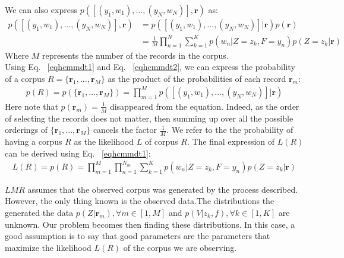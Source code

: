 We can also express $p([(y_{1},w_{1}),...,(y_{N},w_{N})] , \mathbf{r})$ as:
\begin{equation} \label{eqhcmmdt2}
\begin{aligned}
p([(y_{1},w_{1}),...,(y_{N},w_{N})] , \mathbf{r})&=p([(y_{1},w_{1}),...,(y_{N},w_{N})]|\mathbf{r})p(\mathbf{r})\\
&=\frac{1}{M}\prod_{n=1}^{N}\sum_{k=1}^{K}p(w_{n}|Z=z_{k}, F=y_{n})p(Z=z_{k}|\mathbf{r})
\end{aligned}
\end{equation}
Where $M$ represents the number of the records in the corpus.
\\Using Eq. ~\eqref{eqhcmmdt1} and Eq. ~\eqref{eqhcmmdt2}, we can express the probability of a corpus $R=\{\mathbf{r}_{1},...,\mathbf{r}_{M}\}$ as the product of the probabilities of each record $\mathbf{r}_{m}$:
\begin{equation} \label{eqhcmmdt3}
\begin{split}
p(R)=p(\{\mathbf{r}_{1},...,\mathbf{r}_{M}\})=\prod_{m=1}^{M}p([(y_{1},w_{1}),...,(y_{N},w_{N})]|\mathbf{r})
\end{split}
\end{equation}
Here note that $p(\mathbf{r}_{m})=\frac{1}{M}$ disappeared from the equation. Indeed, as the order of selecting the records does not matter, then summing up over all the possible orderings of $\{\mathbf{r}_{1},...,\mathbf{r}_{M}\}$ cancels the factor $\frac{1}{M}$. We refer to the the probability of having a corpus $R$ as the likelihood $L$ of corpus $R$. The final expression of $L(R)$ can be derived using Eq. ~\eqref{eqhcmmdt1}:
\begin{equation} \label{eqhcmmdt4}
\begin{split}
L(R)=p(R)=\prod_{m=1}^{M}\prod_{n=1}^{N_{m}}\sum_{k=1}^{K}p(w_{n}|Z=z_{k}, F=y_{n})p(Z=z_{k}|\mathbf{r})
\end{split}
\end{equation} \par

$LMR$ assumes that the observed corpus was generated by the process described. However, the only thing known is the observed data.The distributions the generated the data  $p(Z|\mathbf{r}_{m}),\forall m \in [1,M]$ and $p(V|z_{k},f), \forall k \in [1,K]$ are unknown. Our problem becomes then finding these distributions. In this case, a good assumption is to say that good parameters are the parameters that maximize the likelihood $L(R)$ of the corpus we are observing. \par

